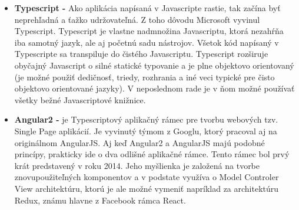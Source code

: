 \begin{itemize}
    \item \textbf{Typescript -} Ako aplikácia napísaná v Javascripte rastie, tak začína byť neprehľadná a ťažko udržovateľná. Z toho dôvodu Microsoft vyvinul Typescript. Typescript je vlastne nadmnožina Javascriptu, ktorá nezahŕňa iba samotný jazyk, ale aj početnú sadu nástrojov. Všetok kód napísaný v Typescripte sa transpiluje do čistého Javascriptu. Typescript rozširuje obyčajný Javascript o silné statické typovanie a je plne objektovo orientovaný (je možné použiť dedičnosť, triedy, rozhrania a iné veci typické pre čisto objektovo orientované jazyky). V neposlednom rade je v ňom možné používať všetky bežné Javascriptové knižnice. \cite{f7jKojjQlPsziQuS}
    \item \textbf{Angular2 -} je Typescriptový aplikačný rámec pre tvorbu webových tzv. Single Page aplikácií. Je vyvinutý týmom z Googlu, ktorý pracoval aj na originálnom AngularJS. Aj keď Angular2 a AngularJS majú podobné princípy, prakticky ide o dva odlišné aplikačné rámce. Tento rámec bol prvý krát predstavený v roku 2014. Jeho myšlienka je založená na tvorbe znovupoužiteľných komponentov a v podstate využíva o Model Controler View architektúru, ktorú je ale možné vymeniť napríklad za architektúru Redux, známu hlavne z Facebook rámca React. \cite{oHlcq3e3366Aa2oa}
    

\end{itemize}
